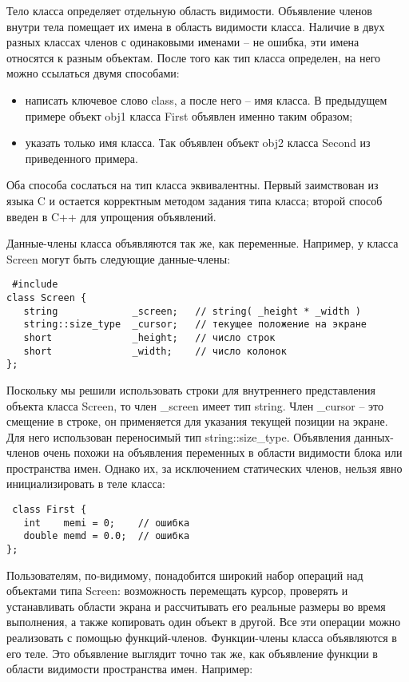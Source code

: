 \documentclass[a4paper,report,14pt]{ncc}
\begin{document}
Тело класса определяет отдельную область видимости. Объявление членов внутри тела помещает их имена в область видимости класса. Наличие в двух разных классах членов с одинаковыми именами – не ошибка, эти имена относятся к разным объектам. После того как тип класса определен, на него можно ссылаться двумя способами:

\begin{itemize}
 \item написать ключевое слово class, а после него – имя класса. В предыдущем примере объект obj1 класса First объявлен именно таким образом;
 \item указать только имя класса. Так объявлен объект obj2 класса Second из приведенного примера.
\end{itemize}

Оба способа сослаться на тип класса эквивалентны. Первый заимствован из языка C и остается корректным методом задания типа класса; второй способ введен в C++ для упрощения объявлений.

Данные-члены класса объявляются так же, как переменные. Например, у класса Screen могут быть следующие данные-члены:

\begin{verbatim}
 #include 
class Screen {
   string             _screen;   // string( _height * _width )
   string::size_type  _cursor;   // текущее положение на экране
   short              _height;   // число строк
   short              _width;    // число колонок
};
\end{verbatim}

Поскольку мы решили использовать строки для внутреннего представления объекта класса Screen, то член \_screen имеет тип string. Член \_cursor – это смещение в строке, он применяется для указания текущей позиции на экране. Для него использован переносимый тип string::size\_type. Объявления данных-членов очень похожи на объявления переменных в области видимости блока или пространства имен. Однако их, за исключением статических членов, нельзя явно инициализировать в теле класса:

\begin{verbatim}
 class First {
   int    memi = 0;    // ошибка
   double memd = 0.0;  // ошибка
};
\end{verbatim}

Пользователям, по-видимому, понадобится широкий набор операций над объектами типа Screen: возможность перемещать курсор, проверять и устанавливать области экрана и рассчитывать его реальные размеры во время выполнения, а также копировать один объект в другой. Все эти операции можно реализовать с помощью функций-членов.
Функции-члены класса объявляются в его теле. Это объявление выглядит точно так же, как объявление функции в области видимости пространства имен. Например:
\end{document}
